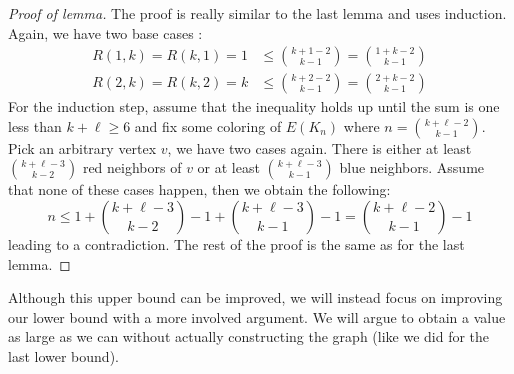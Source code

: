 \documentclass{tufte-handout}
\theoremstyle{definition}
\theoremstyle{remark}
\begin{document}
\begin{proof}[Proof of lemma]
	The proof is really similar to the last lemma and uses induction. Again, we have two base cases : \begin{align*}
	R(1,k) = R(k,1) = 1 &\leq \binom{k+1-2}{k-1} = \binom{1+k-2}{k-1}\\
	R(2,k) = R(k, 2) = k &\leq \binom{k+2-2}{k-1} = \binom{2+k-2}{k-1}
	\end{align*}
	For the induction step, assume that the inequality holds up until the sum is one less than $k+\ell \geq 6$ and fix some coloring of $E(K_n)$ where $n = \binom{k+\ell-2}{k-1}$. Pick an arbitrary vertex $v$, we have two cases again. There is either at least $\binom{k+\ell-3}{k-2}$ red neighbors of $v$ or at least $\binom{k+\ell-3}{k-1}$ blue neighbors. Assume that none of these cases happen, then we obtain the following:
	\[ n \leq 1+\binom{k+\ell-3}{k-2}- 1 + \binom{k+\ell-3}{k-1}-1 = \binom{k+\ell-2}{k-1} -1 \]
	leading to a contradiction. The rest of the proof is the same as for the last lemma.
\end{proof}
Although this upper bound can be improved, we will instead focus on improving our lower bound with a more involved argument. We will argue to obtain a value as large as we can without actually constructing the graph (like we did for the last lower bound).
\end{document}

